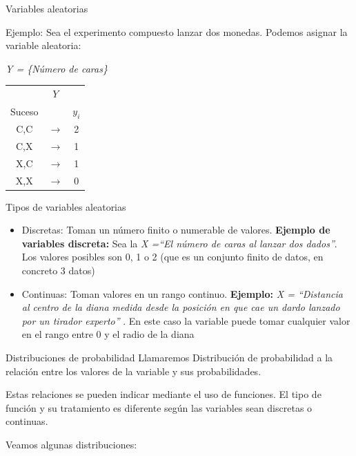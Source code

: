 \documentclass[11pt,handout]{beamer}
\begin{document}
\begin{frame}{Variables aleatorias}
\begin{block}{Ejemplo:}
Sea el experimento compuesto lanzar dos monedas. Podemos asignar la variable aleatoria:
\end{block}
\begin{center}
\emph{Y = \{Número de caras\}} \\
\begin{tabular}{ccc}
 & $Y$ &  \\
Suceso &  &  $y_i$\\ \hline 
C,C & $\rightarrow$ & 2 \\ 
C,X & $\rightarrow$ & 1 \\ 
X,C & $\rightarrow$ & 1 \\ 
X,X & $\rightarrow$ & 0 \\ 
\end{tabular} 
\end{center}
\end{frame}




\begin{frame}{Tipos de variables aleatorias}
\begin{itemize}[<+->]
    \item{Discretas:} Toman un número finito o numerable de valores. \textbf{Ejemplo de variables discreta:} Sea la \emph{X =“El número de caras al lanzar dos dados”}. Los valores posibles son 0, 1 o 2 (que es un conjunto finito de datos, en concreto 3 datos)
\item{Continuas:} Toman valores en un rango continuo. \textbf{Ejemplo:} \emph{X = “Distancia al centro de la diana medida desde la posición en que cae un dardo lanzado por un tirador experto” }. En este caso la variable puede tomar cualquier valor en el rango entre 0 y el radio de la diana 
\end{itemize}

\end{frame}

\begin{frame}{Distribuciones de probabilidad}
Llamaremos Distribución de probabilidad a la relación entre los valores de la variable y sus probabilidades.

Estas relaciones se pueden indicar mediante el uso de funciones. El tipo de función y su tratamiento es diferente según las variables sean discretas o continuas.

Veamos algunas distribuciones:
\end{frame}
\end{document}
